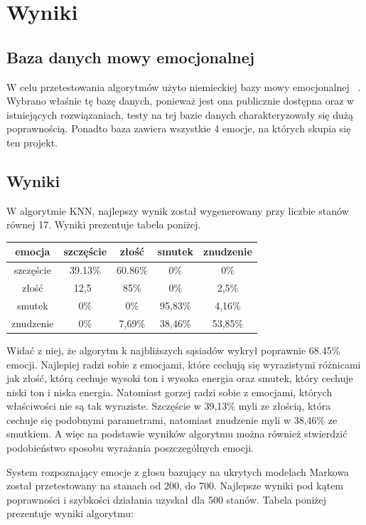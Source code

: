 \documentclass[declaration,shortabstract]{iithesis}
\begin{document}
\chapter{Wyniki}
\section{Baza danych mowy emocjonalnej}
W celu przetestowania algorytmów użyto niemieckiej bazy mowy emocjonalnej ~\cite{BDemo}. Wybrano właśnie tę bazę danych, ponieważ jest ona publicznie dostępna oraz w istniejących rozwiązaniach, testy na tej bazie danych charakteryzowały się dużą poprawnością. Ponadto baza zawiera wszystkie 4 emocje, na których skupia się ten projekt.

\section{Wyniki}
W algorytmie KNN, najlepszy wynik został wygenerowany przy liczbie stanów równej 17. Wyniki prezentuje tabela poniżej.

\begin{center}
  \begin{tabular}{| c | c | c | c | c |}
    \hline
    emocja & szczęście & złość & smutek & znudzenie \\ \hline
    szczęście & 39.13\% & 60.86\% & 0\% & 0\% \\ \hline
	złość & 12,5\ & 85\% & 0\% & 2,5\% \\ \hline
	smutek & 0\% & 0\% & 95,83\% & 4,16\% \\ \hline
	znudzenie & 0\% & 7,69\% & 38,46\% & 53,85\% \\
    \hline
  \end{tabular}
\end{center}

Widać z niej, że algorytm k najbliższych sąsiadów wykrył poprawnie 68.45\% emocji. Najlepiej radzi sobie z emocjami, które cechują się wyrazistymi różnicami jak złość, którą cechuje wysoki ton i wysoka energia oraz smutek, który cechuje niski ton i niska energia. Natomiast gorzej radzi sobie z emocjami, których właściwości nie są tak wyraziste. Szczęście w 39,13\% myli ze złością, która cechuje się podobnymi parametrami, natomiast znudzenie myli w 38,46\% ze smutkiem. A więc na podstawie wyników algorytmu można również stwierdzić podobieństwo sposobu wyrażania poszczególnych emocji.

System rozpoznający emocje z głosu bazujący na ukrytych modelach Markowa został przetestowany na stanach od 200, do 700. Najlepsze wyniki pod kątem poprawności i szybkości działania uzyskał dla 500 stanów. Tabela poniżej prezentuje wyniki algorytmu: 
\end{document}
